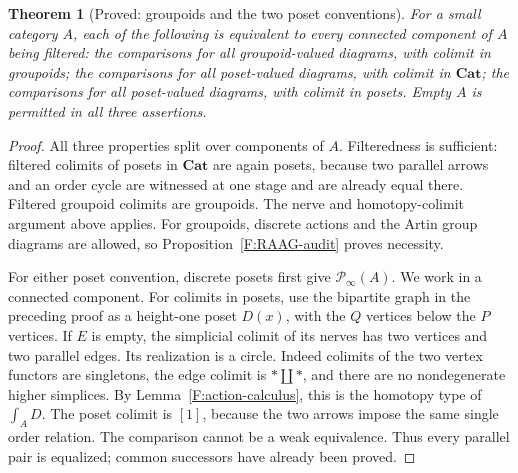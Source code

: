 \documentclass[11pt,a4paper]{article}
\newtheorem{theorem}{Theorem}[section]
\theoremstyle{definition}
\theoremstyle{remark}
\newcommand{\Cat}{\mathbf{Cat}}
\begin{document}
\begin{theorem}[Proved: groupoids and the two poset conventions]
\label{F:groupoid-poset-tests}
For a small category $A$, each of the following is equivalent to
every connected component of $A$ being filtered:
the comparisons for all groupoid-valued diagrams, with colimit in
groupoids; the comparisons for all poset-valued diagrams, with colimit
in $\Cat$; the comparisons for all poset-valued diagrams, with colimit
in posets.  Empty $A$ is permitted in all three assertions.
\end{theorem}
\begin{proof}
All three properties split over components of $A$.  Filteredness is
sufficient: filtered colimits of posets in $\Cat$ are again posets,
because two parallel arrows and an order cycle are witnessed at one
stage and are already equal there.  Filtered groupoid colimits are
groupoids.  The nerve and homotopy-colimit argument above applies.
For groupoids, discrete actions and the Artin group diagrams are
allowed, so Proposition~\ref{F:RAAG-audit} proves necessity.

For either poset convention, discrete posets first give
$\mathcal P_\infty(A)$.  We work in a connected component.
For colimits in posets, use the bipartite graph in the preceding
proof as a height-one poset $D(x)$, with the $Q$ vertices below the
$P$ vertices.  If $E$ is empty, the simplicial colimit of its nerves
has two vertices and two parallel edges.  Its realization is a
circle.  Indeed colimits of the two vertex functors are singletons,
the edge colimit is $*\amalg *$, and there are no nondegenerate
higher simplices.  By Lemma~\ref{F:action-calculus}, this is the
homotopy type of $\int_A D$.  The poset colimit is $[1]$, because
the two arrows impose the same single order relation.  The comparison
cannot be a weak equivalence.  Thus every parallel pair is equalized;
common successors have already been proved.


\end{proof}
\end{document}
